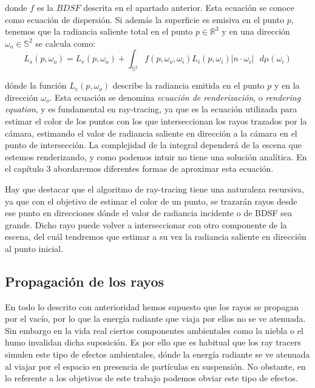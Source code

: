 donde $f$ es la $BDSF$ descrita en el apartado anterior. Esta ecuación se conoce como ecuación de dispersión. Si además la superficie es emisiva en el punto $p$, tenemos que la radiancia saliente total en el punto $p \in \mathds{R}^3$ y en una dirección $\omega _o \in \mathds{S}^2$ se calcula como:
\begin{equation}\label{renderingEquation}
L_s(p,\omega _o) = L_e(p,\omega_o) + \int _{\mathds{S}^2}f(p,\omega _o, \omega _i) L_i(p, \omega _i) |n\cdot \omega _i|\text{ }d\mu (\omega _i)
\end{equation}

dónde la función $L_e(p, \omega_o)$ describe la radiancia emitida en el punto $p$ y en la dirección $\omega_o$. Esta ecuación se denomina \emph{ecuación de renderización}, o \emph{rendering equation}, y es fundamental en ray-tracing, ya que es la ecuación utilizada para estimar el color de los puntos con los que interseccionan los rayos trazados por la cámara, estimando el valor de radiancia saliente en dirección a la cámara en el punto de intersección. La complejidad de la integral dependerá de la escena que estemos renderizando, y como podemos intuir no tiene una solución analítica. En el capítulo 3 abordaremos diferentes formas de aproximar esta ecuación.

Hay que destacar que el algoritmo de ray-tracing tiene una naturaleza recursiva, ya que con el objetivo de estimar el color de un punto, se trazarán rayos desde ese punto en direcciones dónde el valor de radiancia incidente o de BDSF sea grande. Dicho rayo puede volver a interseccionar con otro componente de la escena, del cuál tendremos que estimar a su vez la radiancia saliente en dirección al punto inicial.

\subsection{Propagación de los rayos}

En todo lo descrito con anterioridad hemos supuesto que los rayos se propagan por el vacío, por lo que la energía radiante que viaja por ellos no se ve atenuada. Sin embargo en la vida real ciertos componentes ambientales como la niebla o el humo invalidan dicha suposición. Es por ello que es habitual que los ray tracers simulen este tipo de efectos ambientales, dónde la energía radiante se ve atenuada al viajar por el espacio en presencia de partículas en suspensión. No obstante, en lo referente a los objetivos de este trabajo podemos obviar este tipo de efectos.

